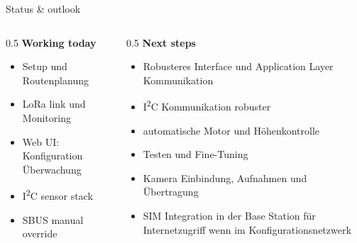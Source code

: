 \begin{frame}{Status \& outlook}
  \begin{columns}[T,onlytextwidth]
    \begin{column}{0.5\textwidth}
      \textbf{\faCheckCircle\; Working today}
      \begin{itemize}
        \item Setup und Routenplanung
        \item LoRa link und Monitoring
        \item Web UI: Konfiguration Überwachung
        \item I\textsuperscript{2}C sensor stack
        \item SBUS manual override
      \end{itemize}
    \end{column}
    \begin{column}{0.5\textwidth}
      \textbf{\faRoad\; Next steps}
      \begin{itemize}
        \item Robusteres Interface und Application Layer Kommunikation
        \item I\textsuperscript{2}C Kommunikation robuster
        \item automatische Motor und Höhenkontrolle
        \item Testen und Fine-Tuning
        \item Kamera Einbindung, Aufnahmen und Übertragung
        \item SIM Integration in der Base Station für Internetzugriff wenn im Konfigurationsnetzwerk
      \end{itemize}
    \end{column}
  \end{columns}
\end{frame}
